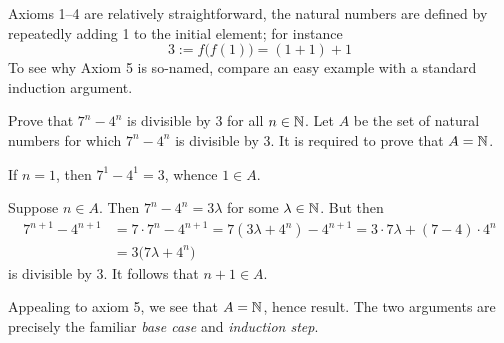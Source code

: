 
Axioms 1--4 are relatively straightforward, the natural numbers are defined by repeatedly adding 1 to the initial element; for instance
\[3:=f\bigl(f(1)\bigr)=(1+1)+1\]
To see why Axiom 5 is so-named, compare an easy example with a standard induction argument.

\begin{example}{}{}
	Prove that $7^n-4^n$ is divisible by 3 for all $n\in\mathbb{N}$.
	\smallbreak
	Let $A$ be the set of natural numbers for which $7^n-4^n$ is divisible by 3. It is required to prove that $A=\mathbb{N}$.
	\begin{enumeratea}
	  \item If $n=1$, then $7^1-4^1=3$, whence $1\in A$.
	  \item Suppose $n\in A$. Then $7^n-4^n=3\lambda$ for some $\lambda\in\mathbb{N}$. But then
		\begin{align*}
		7^{n+1}-4^{n+1}&=7\cdot 7^n-4^{n+1}=7(3\lambda+4^n)-4^{n+1}=3\cdot 7\lambda+(7-4)\cdot 4^n\\
		&=3\bigl(7\lambda+4^n\bigr)
		\end{align*}
	is divisible by 3. It follows that $n+1\in A$.
	\end{enumeratea}
	Appealing to axiom 5, we see that $A=\mathbb{N}$, hence result.\smallbreak
	The two arguments are precisely the familiar \emph{base case} and \emph{induction step}.
\end{example}



